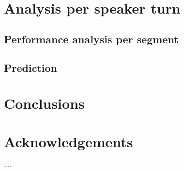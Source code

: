 \documentclass[a4paper]{article}
\begin{document}
\section{Analysis per speaker turn}

\subsection{Performance analysis per segment}

\subsection{Prediction}



\section{Conclusions}



\section{Acknowledgements}


\newpage

\eightpt


\begin{thebibliography}{10}

 ....

\end{thebibliography}
\end{document}
